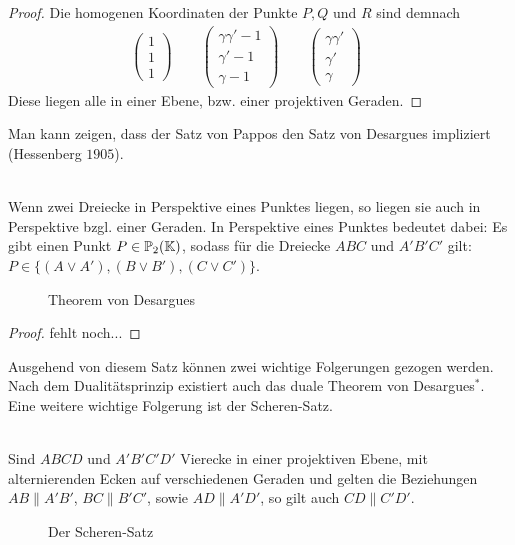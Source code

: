 \begin{proof}
    Die homogenen Koordinaten der Punkte $P,Q$ und $R$ sind demnach
    \begin{align*}
      \begin{pmatrix} 1 \\ 1 \\ 1 \end{pmatrix} \qquad
      \begin{pmatrix} \gamma\gamma'-1\\ \gamma'-1\\ \gamma-1 \end{pmatrix} \qquad
      \begin{pmatrix} \gamma\gamma'  \\ \gamma'  \\ \gamma   \end{pmatrix} \qquad
    \end{align*}
    Diese liegen alle in einer Ebene, bzw. einer projektiven Geraden.
  \end{proof}

  Man kann zeigen, dass der Satz von Pappos den Satz von Desargues impliziert (Hessenberg $1905$).

  \begin{thm} \label{Theorem-von-Desargues}\ \\
    Wenn zwei Dreiecke in Perspektive eines Punktes liegen, so liegen sie auch in Perspektive bzgl. einer Geraden. In Perspektive
    eines Punktes bedeutet dabei: Es gibt einen Punkt $P\in \mathbb{P}_2(\mathbb K)$, sodass für die Dreiecke $ABC$ und $A'B'C'$ gilt:
    $P\in \big\{ (A\vee A'), (B\vee B'), (C\vee C') \big\}$.

    \begin{figure}[ht]
      
      \caption{Theorem von Desargues}
    \end{figure}
  \end{thm}

  \begin{proof}
    fehlt noch...
  \end{proof}

  Ausgehend von diesem Satz können zwei wichtige Folgerungen gezogen werden. Nach dem Dualitätsprinzip existiert auch das duale
  Theorem von Desargues$^*$. Eine weitere wichtige Folgerung ist der Scheren-Satz.

  \begin{thm} \ \\
    Sind $ABCD$ und $A'B'C'D'$ Vierecke in einer projektiven Ebene, mit alternierenden Ecken auf verschiedenen Geraden und gelten
    die Beziehungen $AB\parallel A'B'$, $BC\parallel B'C'$, sowie $AD\parallel A'D'$, so gilt auch $CD \parallel C'D'$.

    \begin{figure}[ht]
      
      \caption{Der Scheren-Satz}
    \end{figure}
  \end{thm}


